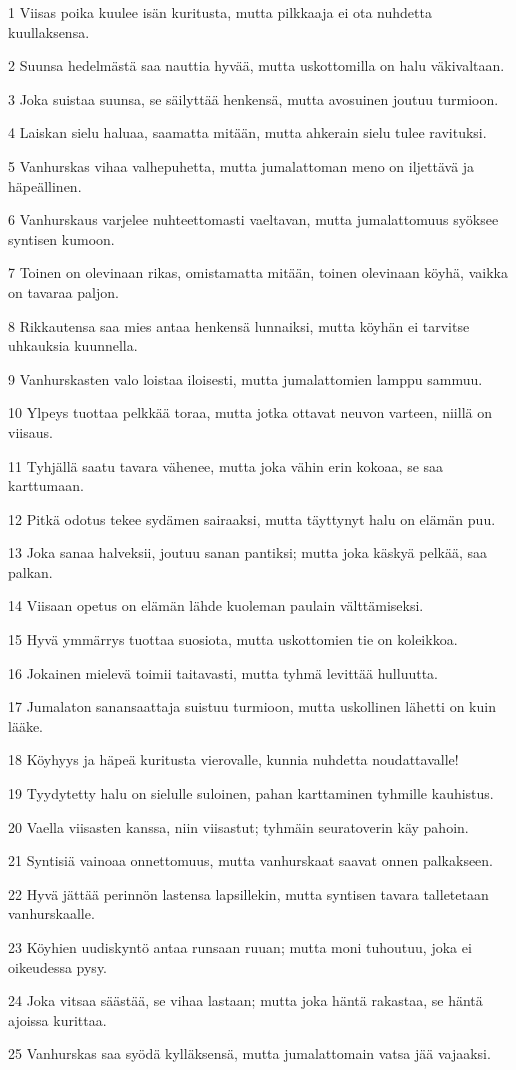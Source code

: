 \par 1 Viisas poika kuulee isän kuritusta, mutta pilkkaaja ei ota nuhdetta kuullaksensa.
\par 2 Suunsa hedelmästä saa nauttia hyvää, mutta uskottomilla on halu väkivaltaan.
\par 3 Joka suistaa suunsa, se säilyttää henkensä, mutta avosuinen joutuu turmioon.
\par 4 Laiskan sielu haluaa, saamatta mitään, mutta ahkerain sielu tulee ravituksi.
\par 5 Vanhurskas vihaa valhepuhetta, mutta jumalattoman meno on iljettävä ja häpeällinen.
\par 6 Vanhurskaus varjelee nuhteettomasti vaeltavan, mutta jumalattomuus syöksee syntisen kumoon.
\par 7 Toinen on olevinaan rikas, omistamatta mitään, toinen olevinaan köyhä, vaikka on tavaraa paljon.
\par 8 Rikkautensa saa mies antaa henkensä lunnaiksi, mutta köyhän ei tarvitse uhkauksia kuunnella.
\par 9 Vanhurskasten valo loistaa iloisesti, mutta jumalattomien lamppu sammuu.
\par 10 Ylpeys tuottaa pelkkää toraa, mutta jotka ottavat neuvon varteen, niillä on viisaus.
\par 11 Tyhjällä saatu tavara vähenee, mutta joka vähin erin kokoaa, se saa karttumaan.
\par 12 Pitkä odotus tekee sydämen sairaaksi, mutta täyttynyt halu on elämän puu.
\par 13 Joka sanaa halveksii, joutuu sanan pantiksi; mutta joka käskyä pelkää, saa palkan.
\par 14 Viisaan opetus on elämän lähde kuoleman paulain välttämiseksi.
\par 15 Hyvä ymmärrys tuottaa suosiota, mutta uskottomien tie on koleikkoa.
\par 16 Jokainen mielevä toimii taitavasti, mutta tyhmä levittää hulluutta.
\par 17 Jumalaton sanansaattaja suistuu turmioon, mutta uskollinen lähetti on kuin lääke.
\par 18 Köyhyys ja häpeä kuritusta vierovalle, kunnia nuhdetta noudattavalle!
\par 19 Tyydytetty halu on sielulle suloinen, pahan karttaminen tyhmille kauhistus.
\par 20 Vaella viisasten kanssa, niin viisastut; tyhmäin seuratoverin käy pahoin.
\par 21 Syntisiä vainoaa onnettomuus, mutta vanhurskaat saavat onnen palkakseen.
\par 22 Hyvä jättää perinnön lastensa lapsillekin, mutta syntisen tavara talletetaan vanhurskaalle.
\par 23 Köyhien uudiskyntö antaa runsaan ruuan; mutta moni tuhoutuu, joka ei oikeudessa pysy.
\par 24 Joka vitsaa säästää, se vihaa lastaan; mutta joka häntä rakastaa, se häntä ajoissa kurittaa.
\par 25 Vanhurskas saa syödä kylläksensä, mutta jumalattomain vatsa jää vajaaksi.

